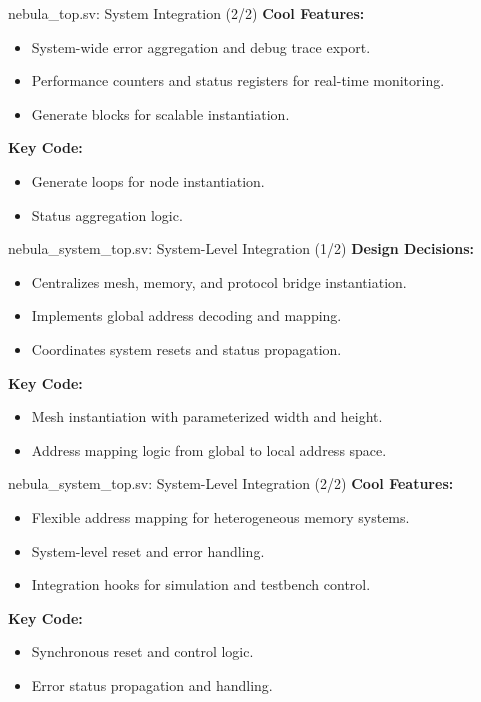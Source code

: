 \documentclass{beamer}
\begin{document}
\begin{frame}{nebula\_top.sv: System Integration (2/2)}
  \textbf{Cool Features:}
  \begin{itemize}
    \item System-wide error aggregation and debug trace export.
    \item Performance counters and status registers for real-time monitoring.
    \item Generate blocks for scalable instantiation.
  \end{itemize}
  \textbf{Key Code:}
  \begin{itemize}
    \item Generate loops for node instantiation.
    \item Status aggregation logic.
  \end{itemize}
\end{frame}

\begin{frame}{nebula\_system\_top.sv: System-Level Integration (1/2)}
  \textbf{Design Decisions:}
  \begin{itemize}
    \item Centralizes mesh, memory, and protocol bridge instantiation.
    \item Implements global address decoding and mapping.
    \item Coordinates system resets and status propagation.
  \end{itemize}
  \textbf{Key Code:}
  \begin{itemize}
    \item Mesh instantiation with parameterized width and height.
    \item Address mapping logic from global to local address space.
  \end{itemize}
\end{frame}

\begin{frame}{nebula\_system\_top.sv: System-Level Integration (2/2)}
  \textbf{Cool Features:}
  \begin{itemize}
    \item Flexible address mapping for heterogeneous memory systems.
    \item System-level reset and error handling.
    \item Integration hooks for simulation and testbench control.
  \end{itemize}
  \textbf{Key Code:}
  \begin{itemize}
    \item Synchronous reset and control logic.
    \item Error status propagation and handling.
  \end{itemize}
\end{frame}
\end{document}
